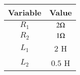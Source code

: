    \begin{tabular}{|c|c|} 
      \hline
\textbf{Variable}& \textbf{Value}\\\hline
         $R_1$ & $2\ohm$\\\hline
          $R_2$ &$1\ohm$\\\hline
          $L_1$  &$2$ H \\ \hline
         $L_2$  &$0.5$ H \\ \hline
    \end{tabular}
